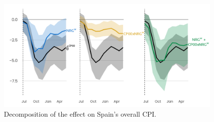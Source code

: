 \documentclass[12pt,a4paper]{article}
\begin{document}
\begin{figure}[!h]
    \centering 
    \includegraphics[width = .9\linewidth]{HICP_weights_12_ES.png}
    \caption{Decomposition of the effect on Spain’s overall CPI.}
    \label{fig:weighted_cp00_es}
\end{figure}
\end{document}
